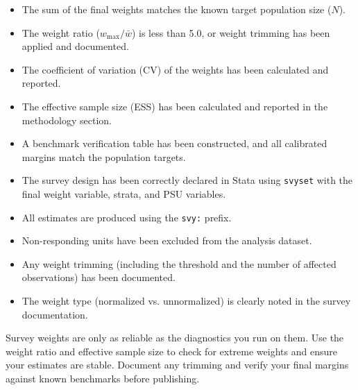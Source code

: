 \documentclass[11pt,a4paper]{article}
\begin{document}
\begin{itemize}[label=$\square$]
  \item The sum of the final weights matches the known target population size ($N$).
  \item The weight ratio ($w_{\max} / \bar{w}$) is less than 5.0, or weight trimming has been applied and documented.
  \item The coefficient of variation (CV) of the weights has been calculated and reported.
  \item The effective sample size (ESS) has been calculated and reported in the methodology section.
  \item A benchmark verification table has been constructed, and all calibrated margins match the population targets.
  \item The survey design has been correctly declared in Stata using \texttt{svyset} with the final weight variable, strata, and PSU variables.
  \item All estimates are produced using the \texttt{svy:} prefix.
  \item Non-responding units have been excluded from the analysis dataset.
  \item Any weight trimming (including the threshold and the number of affected observations) has been documented.
  \item The weight type (normalized vs. unnormalized) is clearly noted in the survey documentation.
\end{itemize}

\begin{keytakeaway}
Survey weights are only as reliable as the diagnostics you run on them. Use the weight ratio and effective sample size to check for extreme weights and ensure your estimates are stable. Document any trimming and verify your final margins against known benchmarks before publishing.
\end{keytakeaway}
\end{document}

